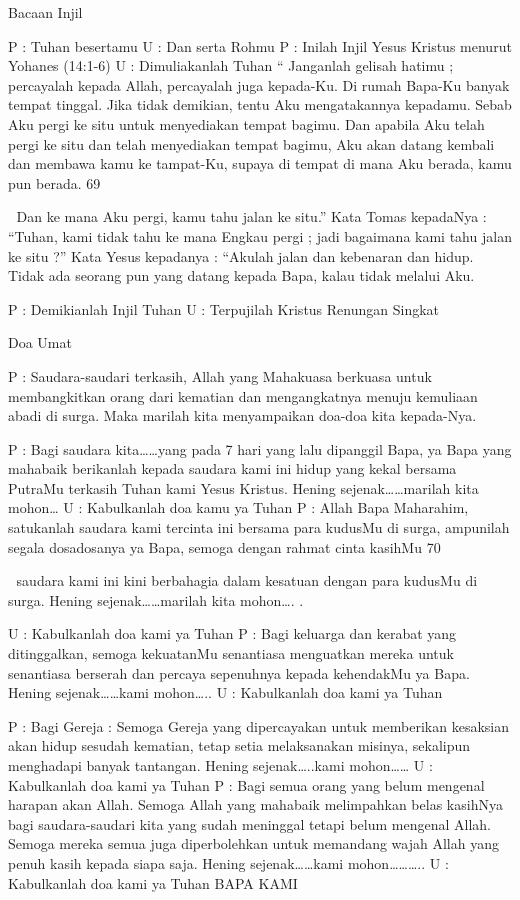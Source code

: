\documentclass[10pt,a5paper,fancyhdr]{memoir}
\begin{document}
Bacaan Injil 

P : Tuhan besertamu 
U : Dan serta Rohmu 
P : Inilah Injil Yesus Kristus menurut Yohanes (14:1-6) 
U 
: Dimuliakanlah Tuhan 
“ Janganlah gelisah hatimu ; percayalah kepada Allah, 
percayalah juga kepada-Ku. Di rumah Bapa-Ku banyak 
tempat tinggal. Jika tidak demikian, tentu Aku 
mengatakannya kepadamu. Sebab Aku pergi ke situ untuk 
menyediakan tempat bagimu. Dan apabila Aku telah pergi 
ke situ dan telah menyediakan tempat bagimu, Aku akan 
datang kembali dan membawa kamu ke tampat-Ku, 
supaya di tempat di mana Aku berada, kamu pun berada. 
69 



Dan ke mana Aku pergi, kamu tahu jalan ke situ.” Kata 
Tomas kepadaNya : “Tuhan, kami tidak tahu ke mana 
Engkau pergi ; jadi bagaimana kami tahu jalan ke situ ?” 
Kata Yesus kepadanya : “Akulah jalan dan kebenaran dan 
hidup. Tidak ada seorang pun yang datang kepada Bapa, 
kalau tidak melalui Aku. 

P 
: Demikianlah Injil Tuhan 
U 
: Terpujilah Kristus 
Renungan Singkat 

Doa Umat 

P 
: Saudara-saudari terkasih, 
Allah yang Mahakuasa berkuasa untuk membangkitkan 
orang dari kematian dan mengangkatnya menuju kemuliaan 
abadi di surga. Maka marilah kita menyampaikan doa-doa 
kita kepada-Nya. 

P 
: Bagi saudara kita……yang pada 7 hari yang lalu dipanggil 
Bapa, ya Bapa yang mahabaik berikanlah kepada saudara 
kami ini hidup yang kekal bersama PutraMu terkasih Tuhan 
kami Yesus Kristus. 
Hening sejenak……marilah kita mohon… 
U 
: Kabulkanlah doa kamu ya Tuhan 
P 
: Allah Bapa Maharahim, satukanlah saudara kami tercinta 
ini bersama para kudusMu di surga, ampunilah segala dosadosanya 
ya Bapa, semoga dengan rahmat cinta kasihMu 
70 



saudara kami ini kini berbahagia dalam kesatuan dengan 
para kudusMu di surga. 
Hening sejenak……marilah kita mohon….
. 


U 
: Kabulkanlah doa kami ya Tuhan 
P : Bagi keluarga dan kerabat yang ditinggalkan, semoga 
kekuatanMu senantiasa menguatkan mereka untuk 
senantiasa berserah dan percaya sepenuhnya kepada 
kehendakMu ya Bapa. 
Hening sejenak……kami mohon….. 
U : Kabulkanlah doa kami ya Tuhan 

P 
: Bagi Gereja : Semoga Gereja yang dipercayakan untuk 
memberikan kesaksian akan hidup sesudah kematian, tetap 
setia melaksanakan misinya, sekalipun menghadapi banyak 
tantangan. 
Hening sejenak…..kami mohon…… 
U 
: Kabulkanlah doa kami ya Tuhan 
P 
: Bagi semua orang yang belum mengenal harapan akan 
Allah. Semoga Allah yang mahabaik melimpahkan belas 
kasihNya bagi saudara-saudari kita yang sudah meninggal 
tetapi belum mengenal Allah. Semoga mereka semua juga 
diperbolehkan untuk memandang wajah Allah yang penuh 
kasih kepada siapa saja. 
Hening sejenak……kami mohon……….. 
U 
: Kabulkanlah doa kami ya Tuhan 
BAPA KAMI 
\end{document}
